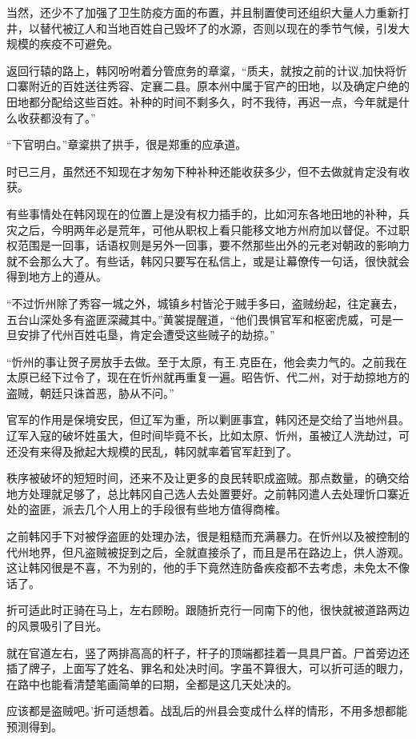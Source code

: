 当然，还少不了加强了卫生防疫方面的布置，并且制置使司还组织大量人力重新打井，以替代被辽人和当地百姓自己毁坏了的水源，否则以现在的季节气候，引发大规模的疾疫不可避免。

返回行辕的路上，韩冈吩咐着分管庶务的章楶，“质夫，就按之前的计议,加快将忻口寨附近的百姓送往秀容、定襄二县。原本州中属于官产的田地，以及确定户绝的田地都分配给这些百姓。补种的时间不剩多久，时不我待，再迟一点，今年就是什么收获都没有了。”

“下官明白。”章楶拱了拱手，很是郑重的应承道。

时已三月，虽然还不知现在才匆匆下种补种还能收获多少，但不去做就肯定没有收获。

有些事情处在韩冈现在的位置上是没有权力插手的，比如河东各地田地的补种，兵灾之后，今明两年必是荒年，可他从职权上看只能移文地方州府加以督促。不过职权范围是一回事，话语权则是另外一回事，要不然那些出外的元老对朝政的影响力就不会那么大了。有些话，韩冈只要写在私信上，或是让幕僚传一句话，很快就会得到地方上的遵从。

“不过忻州除了秀容一城之外，城镇乡村皆沦于贼手多曰，盗贼纷起，往定襄去，五台山深处多有盗匪深藏其中。”黄裳提醒道，“他们畏惧官军和枢密虎威，可是一旦安排了代州百姓屯垦，肯定会遭受这些贼子的劫掠。”

“忻州的事让贺子房放手去做。至于太原，有王.克臣在，他会卖力气的。之前我在太原已经下过令了，现在在忻州就再重复一遍。昭告忻、代二州，对于劫掠地方的盗贼，朝廷只诛首恶，胁从不问。”

官军的作用是保境安民，但辽军为重，所以剿匪事宜，韩冈还是交给了当地州县。辽军入寇的破坏姓虽大，但时间毕竟不长，比如太原、忻州，虽被辽人洗劫过，可还没有来得及掀起大规模的民乱，韩冈就率着官军赶到了。

秩序被破坏的短短时间，还来不及让更多的良民转职成盗贼。那点数量，的确交给地方处理就足够了，总比韩冈自己选人去处置要好。之前韩冈遣人去处理忻口寨近处的盗匪，派去几个人用上的手段很有些地方值得商榷。

之前韩冈手下对被俘盗匪的处理办法，很是粗糙而充满暴力。在忻州以及被控制的代州地界，但凡盗贼被捉到之后，全就直接杀了，而且是吊在路边上，供人游观。这让韩冈很是不喜，不为别的，他的手下竟然连防备疾疫都不去考虑，未免太不像话了。

折可适此时正骑在马上，左右顾盼。跟随折克行一同南下的他，很快就被道路两边的风景吸引了目光。

就在官道左右，竖了两排高高的杆子，杆子的顶端都挂着一具具尸首。尸首旁边还插了牌子，上面写了姓名、罪名和处决时间。字虽不算很大，可以折可适的眼力，在路中也能看清楚笔画简单的曰期，全都是这几天处决的。

应该都是盗贼吧。’折可适想着。战乱后的州县会变成什么样的情形，不用多想都能预测得到。

